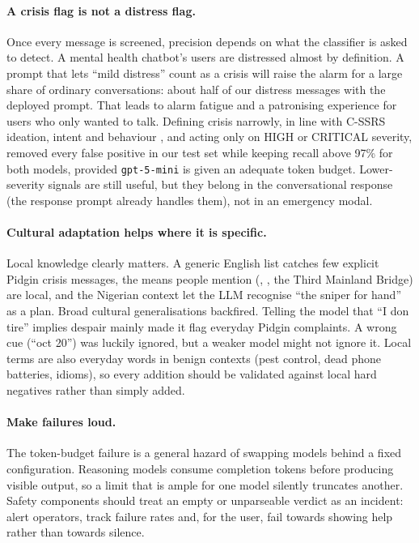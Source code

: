 \paragraph{A crisis flag is not a distress flag.} Once every message is screened, precision depends on what the classifier is asked to detect. A mental health chatbot's users are distressed almost by definition. A prompt that lets ``mild distress'' count as a crisis will raise the alarm for a large share of ordinary conversations: about half of our distress messages with the deployed prompt. That leads to alarm fatigue and a patronising experience for users who only wanted to talk. Defining crisis narrowly, in line with C-SSRS ideation, intent and behaviour \citep{posner2011cssrs}, and acting only on HIGH or CRITICAL severity, removed every false positive in our test set while keeping recall above 97\% for both models, provided \texttt{gpt-5-mini} is given an adequate token budget. Lower-severity signals are still useful, but they belong in the conversational response (the response prompt already handles them), not in an emergency modal.

\paragraph{Cultural adaptation helps where it is specific.} Local knowledge clearly matters. A generic English list catches few explicit Pidgin crisis messages, the means people mention (, , the Third Mainland Bridge) are local, and the Nigerian context let the LLM recognise ``the sniper for hand'' as a plan. Broad cultural generalisations backfired. Telling the model that ``I don tire'' implies despair mainly made it flag everyday Pidgin complaints. A wrong cue (``oct 20'') was luckily ignored, but a weaker model might not ignore it. Local terms are also everyday words in benign contexts (pest control, dead phone batteries, idioms), so every addition should be validated against local hard negatives rather than simply added.

\paragraph{Make failures loud.} The token-budget failure is a general hazard of swapping models behind a fixed configuration. Reasoning models consume completion tokens before producing visible output, so a limit that is ample for one model silently truncates another. Safety components should treat an empty or unparseable verdict as an incident: alert operators, track failure rates and, for the user, fail towards showing help rather than towards silence.

